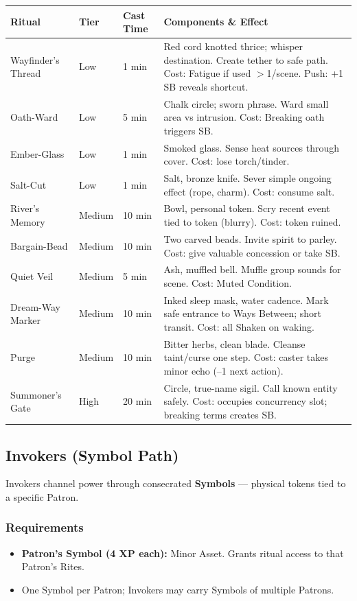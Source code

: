 \begin{tabular}{@{}lllp{4cm}@{}}
\toprule
\textbf{Ritual} & \textbf{Tier} & \textbf{Cast Time} & \textbf{Components \& Effect} \\
\midrule
Wayfinder's Thread & Low & 1 min & Red cord knotted thrice; whisper destination. Create tether to safe path. Cost: Fatigue if used $>$1/scene. Push: +1 SB reveals shortcut. \\
Oath-Ward & Low & 5 min & Chalk circle; sworn phrase. Ward small area vs intrusion. Cost: Breaking oath triggers SB. \\
Ember-Glass & Low & 1 min & Smoked glass. Sense heat sources through cover. Cost: lose torch/tinder. \\
Salt-Cut & Low & 1 min & Salt, bronze knife. Sever simple ongoing effect (rope, charm). Cost: consume salt. \\
River's Memory & Medium & 10 min & Bowl, personal token. Scry recent event tied to token (blurry). Cost: token ruined. \\
Bargain-Bead & Medium & 10 min & Two carved beads. Invite spirit to parley. Cost: give valuable concession or take SB. \\
Quiet Veil & Medium & 5 min & Ash, muffled bell. Muffle group sounds for scene. Cost: Muted Condition. \\
Dream-Way Marker & Medium & 10 min & Inked sleep mask, water cadence. Mark safe entrance to Ways Between; short transit. Cost: all Shaken on waking. \\
Purge & Medium & 10 min & Bitter herbs, clean blade. Cleanse taint/curse one step. Cost: caster takes minor echo (–1 next action). \\
Summoner's Gate & High & 20 min & Circle, true-name sigil. Call known entity safely. Cost: occupies concurrency slot; breaking terms creates SB. \\
\bottomrule
\end{tabular}

\subsection{Invokers (Symbol Path)}

Invokers channel power through consecrated \textbf{Symbols} — physical tokens tied to a specific Patron.

\subsubsection{Requirements}
\begin{itemize}
  \item \textbf{Patron's Symbol (4 XP each):} Minor Asset. Grants ritual access to that Patron's Rites.
  \item One Symbol per Patron; Invokers may carry Symbols of multiple Patrons.
\end{itemize}

